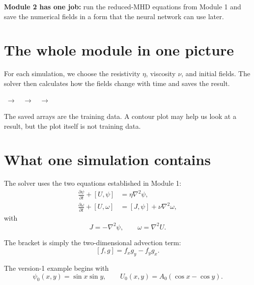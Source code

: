 \documentclass[11pt]{article}
\newcommand{\bracket}[2]{\left[#1,#2\right]}
\begin{document}

\begin{overviewbox}
\textbf{Module 2 has one job:} run the reduced-MHD equations from Module 1 and save the numerical fields in a form that the neural network can use later.
\end{overviewbox}

\ProjectTOC

\section{The whole module in one picture}

For each simulation, we choose the resistivity $\eta$, viscosity $\nu$, and initial fields. The solver then calculates how the fields change with time and saves the result.

\begin{center}
$\;\longrightarrow\;$
$\;\longrightarrow\;$
$\;\longrightarrow\;$
\end{center}

The saved arrays are the training data. A contour plot may help us look at a result, but the plot itself is not training data.

\section{What one simulation contains}

The solver uses the two equations established in Module 1:
\begin{align}
\frac{\partial \psi}{\partial t}+\bracket{U}{\psi}
  &=\eta\nabla^2\psi,\\
\frac{\partial \omega}{\partial t}+\bracket{U}{\omega}
  &=\bracket{J}{\psi}+\nu\nabla^2\omega,
\end{align}
with
\begin{equation}
J=-\nabla^2\psi,
\qquad
\omega=\nabla^2U.
\end{equation}

The bracket is simply the two-dimensional advection term:
\begin{equation}
\bracket{f}{g}=f_xg_y-f_yg_x.
\end{equation}

The version-1 example begins with
\begin{equation}
\psi_0(x,y)=\sin x\sin y,
\qquad
U_0(x,y)=A_0(\cos x-\cos y).
\end{equation}
\end{document}
